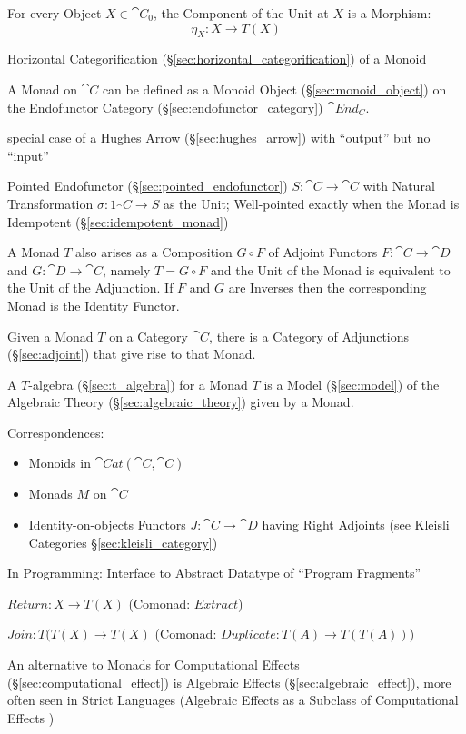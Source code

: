 For every Object $X \in \cat{C}_0$, the Component of the Unit at $X$
is a Morphism:
\[
  \eta_X : X \rightarrow T (X)
\]

Horizontal Categorification (\S\ref{sec:horizontal_categorification})
of a Monoid

A Monad on $\cat{C}$ can be defined as a Monoid Object
(\S\ref{sec:monoid_object}) on the Endofunctor Category
(\S\ref{sec:endofunctor_category}) $\cat{End_C}$.

special case of a Hughes Arrow (\S\ref{sec:hughes_arrow}) with
``output'' but no ``input''

Pointed Endofunctor (\S\ref{sec:pointed_endofunctor}) $S : \cat{C}
\rightarrow \cat{C}$ with Natural Transformation $\sigma : 1_\cat{C}
\rightarrow S$ as the Unit; Well-pointed exactly when the Monad is
Idempotent (\S\ref{sec:idempotent_monad})

A Monad $T$ also arises as a Composition $G \circ F$ of Adjoint
Functors $F : \cat{C} \rightarrow \cat{D}$ and $G : \cat{D}
\rightarrow \cat{C}$, namely $T = G \circ F$ and the Unit of the Monad
is equivalent to the Unit of the Adjunction. If $F$ and $G$ are
Inverses then the corresponding Monad is the Identity Functor.

Given a Monad $T$ on a Category $\cat{C}$, there is a Category of
Adjunctions (\S\ref{sec:adjoint}) that give rise to that Monad.

A $T$-algebra (\S\ref{sec:t_algebra}) for a Monad $T$ is a Model
(\S\ref{sec:model}) of the Algebraic Theory
(\S\ref{sec:algebraic_theory}) given by a Monad.

Correspondences: \cite{jacobs-heunen-hasuo09}
\begin{itemize}
\item Monoids in $\cat{Cat}(\cat{C},\cat{C})$
\item Monads $M$ on $\cat{C}$
\item Identity-on-objects Functors $J : \cat{C} \rightarrow \cat{D}$
  having Right Adjoints (see Kleisli Categories
  \S\ref{sec:kleisli_category})
\end{itemize}

In Programming: Interface to Abstract Datatype of ``Program
Fragments''

$Return : X \rightarrow T(X)$ (Comonad: $Extract$)

$Join : T(T(X) \rightarrow T(X)$ (Comonad: $Duplicate : T(A)
\rightarrow T(T(A))$)

An alternative to Monads for Computational Effects
(\S\ref{sec:computational_effect}) is Algebraic Effects
(\S\ref{sec:algebraic_effect}), more often seen in Strict Languages
(Algebraic Effects as a Subclass of Computational Effects
\cite{plotkin-pretnar09})

